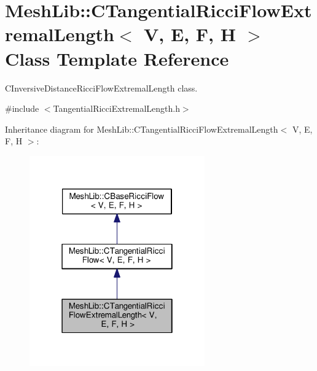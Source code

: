 \hypertarget{class_mesh_lib_1_1_c_tangential_ricci_flow_extremal_length}{}\section{Mesh\+Lib\+:\+:C\+Tangential\+Ricci\+Flow\+Extremal\+Length$<$ V, E, F, H $>$ Class Template Reference}
\label{class_mesh_lib_1_1_c_tangential_ricci_flow_extremal_length}


C\+Inversive\+Distance\+Ricci\+Flow\+Extremal\+Length class.  




{\ttfamily \#include $<$Tangential\+Ricci\+Extremal\+Length.\+h$>$}



Inheritance diagram for Mesh\+Lib\+:\+:C\+Tangential\+Ricci\+Flow\+Extremal\+Length$<$ V, E, F, H $>$\+:
\nopagebreak
\begin{figure}[H]
\begin{center}
\leavevmode
\includegraphics[width=214pt]{class_mesh_lib_1_1_c_tangential_ricci_flow_extremal_length__inherit__graph}
\end{center}
\end{figure}


